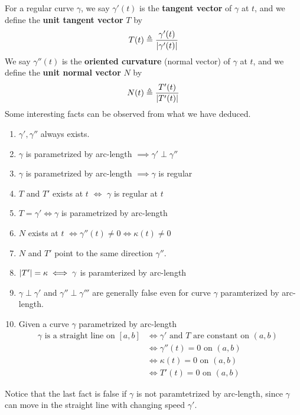 \documentclass{report}
\begin{document}
\begin{mdframed}
For a regular curve $\gamma $, we say $\gamma '(t)$ is the \textbf{tangent vector} of $\gamma $ at $t$, and we define the \textbf{unit tangent vector} $T$ by    
\begin{align*}
T(t)\triangleq \frac{\gamma '(t)}{\left|\gamma '(t)\right|}
\end{align*}
We say $\gamma ''(t)$ is the \textbf{oriented curvature} (normal vector) of $\gamma $ at $t$, and we define the  \textbf{unit normal vector} $N$ by 
 \begin{align*}
N(t)\triangleq \frac{T'(t)}{\left|T'(t)\right|}
\end{align*}
Some interesting facts can be observed from what we have deduced.
\begin{enumerate}[label=(\alph*)]
  \item $\gamma ',\gamma ''$ always exists. 
  \item $\gamma $ is parametrized by arc-length $\implies \gamma ' \perp \gamma ''$
  \item $\gamma $ is parametrized by arc-length $\implies \gamma $ is regular
  \item $T$ and $T'$ exists at $t$  $\iff $ $\gamma $ is regular at $t$ 
  \item $T=\gamma '\iff \gamma $ is parametrized by arc-length   
  \item $N$ exists at $t$ $\iff \gamma ''(t)\neq 0\iff  \kappa (t)\neq 0$  
  \item $N$ and  $T'$ point to the same direction $\gamma ''$.
  \item $\left|T'\right|=\kappa\iff \gamma $ is paramterized by arc-length 
  \item $\gamma \perp \gamma '$ and $\gamma'' \perp \gamma '''$ are generally false even for curve $\gamma $ paramterized by arc-length. 
  \item Given a curve $\gamma $ parametrized by arc-length
\begin{align*}
  \gamma \text{ is a straight line on }[a,b]&\iff  \gamma '\text{ and }T\text{ are constant on $(a,b)$ }\\
  &\iff \gamma ''(t)=0\text{ on $(a,b)$ }\\
  &\iff \kappa (t)=0\text{ on $(a,b)$ }\\
  &\iff T'(t)=0\text{ on }(a,b)
\end{align*}
\end{enumerate}
Notice that the last fact is false if $\gamma $ is not paramtetrized by arc-length, since $\gamma $ can move in the straight line with changing speed $\gamma '$.  
\end{mdframed}
\end{document}
